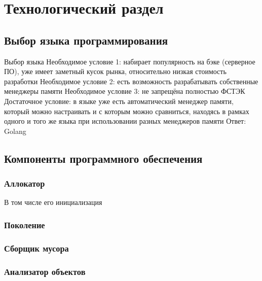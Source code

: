 \chapter{Технологический раздел}



\section{Выбор языка программирования}

Выбор языка
Необходимое условие 1: набирает популярность на бэке (серверное ПО), уже имеет заметный кусок рынка, относительно низкая стоимость разработки
Необходимое условие 2: есть возможность разрабатывать собственные менеджеры памяти
Необходимое условие 3: не запрещёна полностью ФСТЭК
Достаточное условие: в языке уже есть автоматический менеджер памяти, который можно настраивать и с которым можно сравниться, находясь в рамках одного и того же языка при использовании разных менеджеров памяти
Ответ: Golang

\section{Компоненты программного обеспечения}

\subsection{Аллокатор}

В том числе его инициализация

\subsection{Поколение}

\subsection{Сборщик мусора}

\subsection{Анализатор объектов}




%
%
%

